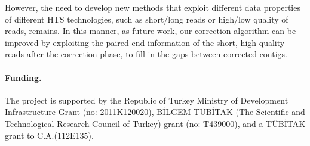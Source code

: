 \documentclass{llncs}
\begin{document}
However, the need to develop new methods that exploit different data properties of different HTS technologies, such as short/long reads or high/low quality of reads, remains. In this manner, as future work, our correction algorithm can be improved by exploiting the paired end information of the short, high quality reads after the correction phase, to fill in the gaps between corrected contigs.

\paragraph{Funding.}

The project is supported by the Republic of Turkey Ministry of Development Infrastructure Grant (no: 2011K120020), BİLGEM TÜBİTAK (The Scientific and Technological Research Council of Turkey) grant (no: T439000), and a TÜBİTAK grant to C.A.(112E135).\\
\end{document}
